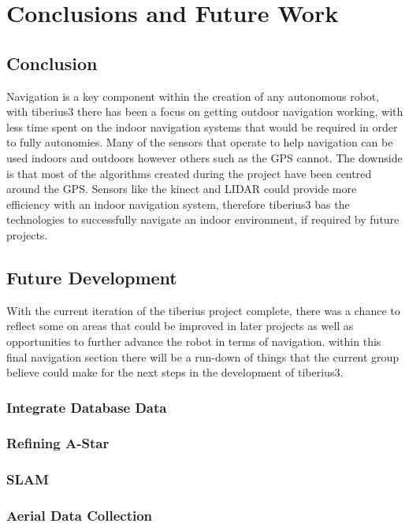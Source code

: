 \section{Conclusions and Future Work}

\subsection{Conclusion}
Navigation is a key component within the creation of any autonomous robot, with \gls{tiberius3} there has been a focus on getting outdoor navigation working, with less time spent on the indoor navigation systems that would be required in order to fully autonomies.
\newline
Many of the sensors that operate to help navigation can be used indoors and outdoors however others such as the \gls{GPS} cannot. The downside is that most of the algorithms created during the project have been centred around the \gls{GPS}. Sensors like the kinect and \gls{LIDAR} could provide more efficiency with an indoor navigation system, therefore \gls{tiberius3} bas the technologies to successfully navigate an indoor environment, if required by future projects.
\subsection{Future Development}
With the current iteration of the tiberius project complete, there was a chance to reflect some on areas that could be improved in later projects as well as opportunities to further advance the robot in terms of navigation. within this final navigation section there will be a run-down of things that the current group believe could make for the next steps in the development of \gls{tiberius3}. 
\subsubsection{Integrate Database Data}

\subsubsection{Refining A-Star}

\subsubsection{SLAM}

\subsubsection{Aerial Data Collection}
